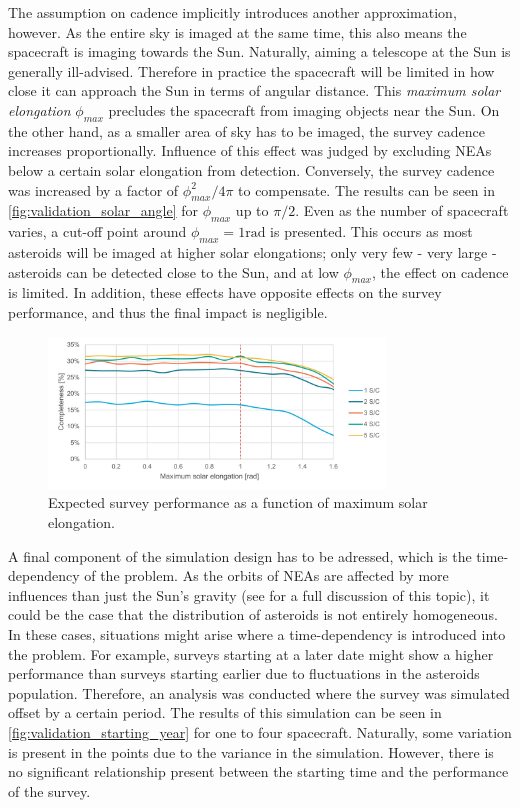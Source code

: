 The assumption on cadence implicitly introduces another approximation, however. As the entire sky is imaged at the same time, this also means the spacecraft is imaging towards the Sun. Naturally, aiming a telescope at the Sun is generally ill-advised. Therefore in practice the spacecraft will be limited in how close it can approach the Sun in terms of angular distance. This \textit{maximum solar elongation} $\phi_{max}$ precludes the spacecraft from imaging objects near the Sun. On the other hand, as a smaller area of sky has to be imaged, the survey cadence increases proportionally. Influence of this effect was judged by excluding NEAs below a certain solar elongation from detection. Conversely, the survey cadence was increased by a factor of $\phi_{max}^2 / 4\pi$ to compensate. The results can be seen in \autoref{fig:validation_solar_angle} for $\phi_{max}$ up to $\pi/2$. Even as the number of spacecraft varies, a cut-off point around $\phi_{max} = 1\mathrm{rad}$ is presented. This occurs as most asteroids will be imaged at higher solar elongations; only very few - very large - asteroids can be detected close to the Sun, and at low $\phi_{max}$, the effect on cadence is limited. In addition, these effects have opposite effects on the survey performance, and thus the final impact is negligible.

\begin{figure}[htbp]
 \centering
 \includegraphics[width=0.8\textwidth]{img/validation_solar_angle.pdf}
 \caption{Expected survey performance as a function of maximum solar elongation.}
 \label{fig:validation_solar_angle}
\end{figure}

A final component of the simulation design has to be adressed, which is the time-dependency of the problem. As the orbits of NEAs are affected by more influences than just the Sun's gravity (see \cite{GranvikPopulation} for a full discussion of this topic), it could be the case that the distribution of asteroids is not entirely homogeneous. In these cases, situations might arise where a time-dependency is introduced into the problem. For example, surveys starting at a later date might show a higher performance than surveys starting earlier due to fluctuations in the asteroids population. Therefore, an analysis was conducted where the survey was simulated offset by a certain period. The results of this simulation can be seen in \autoref{fig:validation_starting_year} for one to four spacecraft. Naturally, some variation is present in the points due to the variance in the simulation. However, there is no significant relationship present between the starting time and the performance of the survey.


